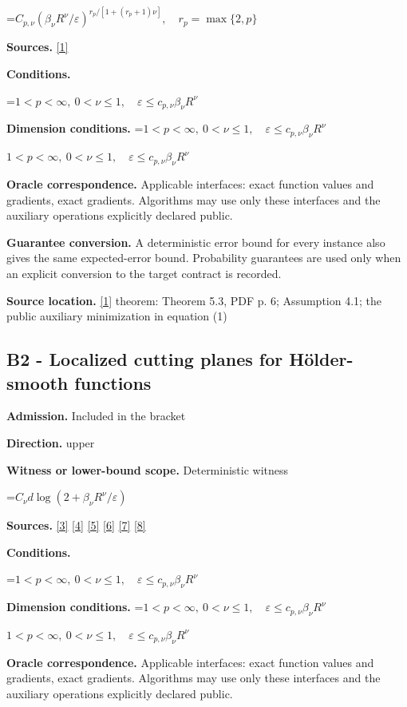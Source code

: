 \documentclass[10pt,a4paper]{article}
\newcommand{\AtlasMath}[1]{\par\begingroup\centering\setbox0=\hbox{$\displaystyle #1$}\ifdim\wd0>1.4\linewidth\typeout{ATLAS WIDE FORMULA: \the\wd0}\fi\ifdim\wd0>\linewidth\resizebox{\linewidth}{!}{\box0}\else\box0\fi\par\endgroup}
\newcommand{\AtlasInlineMath}[1]{\begingroup\setbox0=\hbox{$#1$}\ifdim\wd0>.4\linewidth\endgroup\AtlasMath{#1}\else\endgroup$#1$\fi}
\begin{document}
\AtlasMath{C_{p,\nu}(\beta_\nu R^\nu/\varepsilon)^{r_p/[1+(r_p+1)\nu]},\quad r_p=\max\{2,p\}}
\textbf{Sources.} \href{https://arxiv.org/pdf/2609.01122}{[1]}

\textbf{Conditions.} 
\AtlasMath{1<p<\infty,\ 0<\nu\le1,\quad\varepsilon\le c_{p,\nu}\beta_\nu R^\nu}


\textbf{Dimension conditions.} \AtlasInlineMath{1<p<\infty,\ 0<\nu\le1,\quad\varepsilon\le c_{p,\nu}\beta_\nu R^\nu}

\textbf{Oracle correspondence.} Applicable interfaces: exact function values and gradients, exact gradients. Algorithms may use only these interfaces and the auxiliary operations explicitly declared public.

\textbf{Guarantee conversion.} A deterministic error bound for every instance also gives the same expected-error bound. Probability guarantees are used only when an explicit conversion to the target contract is recorded.

\textbf{Source location.} \href{https://arxiv.org/pdf/2609.01122}{[1]} theorem: Theorem 5.3, PDF p. 6; Assumption 4.1; the public auxiliary minimization in equation (1)

\subsection{B2 - Localized cutting planes for Hölder-smooth functions}
\textbf{Admission.} Included in the bracket

\textbf{Direction.} upper

\textbf{Witness or lower-bound scope.} Deterministic witness

\AtlasMath{C_\nu d\log(2+\beta_\nu R^\nu/\varepsilon)}
\textbf{Sources.} \href{https://arxiv.org/pdf/2101.09740v2}{[3]} \href{https://arxiv.org/pdf/2609.33360v2}{[4]} \href{https://arxiv.org/pdf/2609.10874}{[5]} \href{https://arxiv.org/pdf/1405.4980}{[6]} \href{https://www2.isye.gatech.edu/~nemirovs/MOR_AccuracyCertificates.pdf}{[7]} \href{https://arxiv.org/pdf/2609.20701}{[8]}

\textbf{Conditions.} 
\AtlasMath{1<p<\infty,\ 0<\nu\le1,\quad\varepsilon\le c_{p,\nu}\beta_\nu R^\nu}


\textbf{Dimension conditions.} \AtlasInlineMath{1<p<\infty,\ 0<\nu\le1,\quad\varepsilon\le c_{p,\nu}\beta_\nu R^\nu}

\textbf{Oracle correspondence.} Applicable interfaces: exact function values and gradients, exact gradients. Algorithms may use only these interfaces and the auxiliary operations explicitly declared public.
\end{document}
